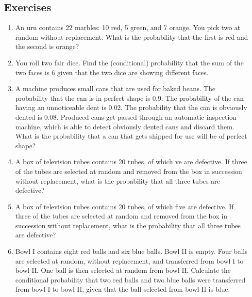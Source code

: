 \documentclass[../main.tex]{subfiles}
\begin{document}
{\fontsize{10}{10}\selectfont

\subsection{Exercises}
\begin{enumerate}
	
	\item An urn contains 22 marbles: 10 red, 5 green, and 7 orange. You pick two at
	random without replacement. What is the probability that the first is red
	and the second is orange?
	
	\item You roll two fair dice. Find the (conditional) probability that the sum of the
	two faces is 6 given that the two dice are showing different faces.
	
	\item A machine produces small cans that are used for baked beans. The probability
	 that the can is in perfect shape is 0.9. The probability of the can having
	an unnoticeable dent is 0.02. The probability that the can is obviously dented
	is 0.08. Produced cans get passed through an automatic inspection machine,
	which is able to detect obviously dented cans and discard them. What is the
	probability that a can that gets shipped for use will be of perfect shape?
	
	\item A box of television tubes contains 20 tubes, of which ve are defective. If
	three of the tubes are selected at random and removed from the box in
	succession without replacement, what is the probability that all three tubes
	are defective?
	
	\item A box of television tubes contains 20 tubes, of which five are defective. If
	three of the tubes are selected at random and removed from the box in
	succession without replacement, what is the probability that all three tubes
	are defective?
	
	\item Bowl I contains eight red balls and six blue balls. Bowl II is empty. Four
	balls are selected at random, without replacement, and transferred from bowl
	I to bowl II. One ball is then selected at random from bowl II.
	Calculate the conditional probability that two red balls and two blue balls
	were transferred from bowl I to bowl II, given that the ball selected from
	bowl II is blue.
	

\end{enumerate}}
\end{document}
